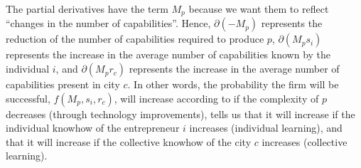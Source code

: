 \documentclass[12pt]{article}
\begin{document}
The partial derivatives have the term $M_p$ because we want them to reflect ``changes in the number of capabilities''. Hence, $\partial (-M_p)$ represents the reduction of the number of capabilities required to produce $p$, $\partial (M_p s_i)$ represents the increase in the average number of capabilities known by the individual $i$, and $\partial (M_p r_c)$ represents the increase in the average number of capabilities present in city $c$. In other words, the probability the firm will be successful, $f(M_p, s_i, r_c)$, will increase according to  if the complexity of $p$ decreases (through technology improvements),  tells us that it will increase if the individual knowhow of the entrepreneur $i$ increases (individual learning), and  that it will increase if the collective knowhow of the city $c$ increases (collective learning).
\end{document}
